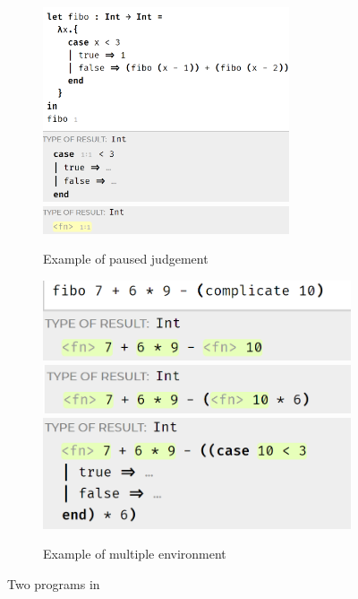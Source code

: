 \begin{figure}[htbp]
  \centering
  \begin{subfigure}[b]{0.4\textwidth}
      \centering
      \includegraphics[width=0.8\textwidth]{img/pause_fibo.png}
      \includegraphics[width=0.8\textwidth]{img/pause_fibo2.png}
      \caption{Example of paused judgement}
      \label{fig:pause}
  \end{subfigure}
  \hfill
  \begin{subfigure}[b]{0.4\textwidth}
      \centering
      \includegraphics[width=\textwidth]{img/interactive1.png}
      \includegraphics[width=\textwidth]{img/interactive2.png}
      \includegraphics[width=\textwidth]{img/interacitve3.png}
      \caption{Example of multiple environment}
      \label{fig:multiple}
  \end{subfigure}
    \caption{Two programs in \Hazel}
    \label{fig:intro_example}
\end{figure}


